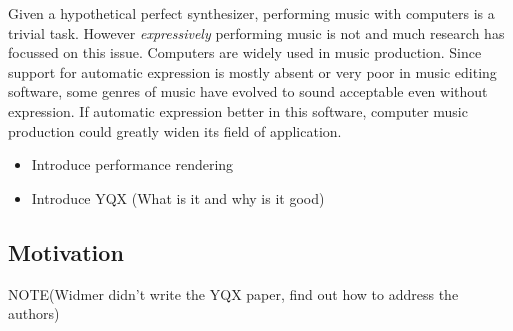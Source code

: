 \documentclass[a4paper,10pt]{article}
\begin{document}
Given a hypothetical perfect synthesizer, performing music with computers is a trivial task. However \textit{expressively} performing music is not and much research has focussed on this issue. Computers are widely used in music production. Since support for automatic expression is mostly absent or very poor in music editing software, some genres of music have evolved to sound acceptable even without expression. If automatic expression better in this software, computer music production could greatly widen its field of application.

\begin{itemize}
\item Introduce performance rendering
\item Introduce YQX (What is it and why is it good)

\end{itemize}




\subsection{Motivation}

NOTE(Widmer didn't write the YQX paper, find out how to address the authors)
\end{document}
